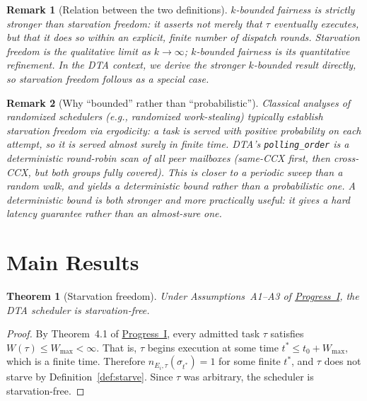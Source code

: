 \documentclass[11pt,a4paper]{article}
\newtheorem{theorem}{Theorem}[section]
\newtheorem{remark}{Remark}[section]
\newcommand{\code}[1]{\texttt{#1}}
\begin{document}
\begin{remark}[Relation between the two definitions]
$k$-bounded fairness is strictly stronger than starvation freedom:
it asserts not merely that $\tau$ \emph{eventually} executes, but
that it does so within an \emph{explicit, finite} number of dispatch
rounds.  Starvation freedom is the qualitative limit as
$k \to \infty$; $k$-bounded fairness is its quantitative
refinement.  In the DTA context, we derive the stronger
$k$-bounded result directly, so starvation freedom follows as a
special case.
\end{remark}

\begin{remark}[Why ``bounded'' rather than ``probabilistic'']
Classical analyses of randomized schedulers (e.g., randomized
work-stealing) typically establish starvation freedom via ergodicity:
a task is served with positive probability on each attempt, so it
is served almost surely in finite time.  DTA's \code{polling\_order}
is a \emph{deterministic} round-robin scan of all peer mailboxes
(same-CCX first, then cross-CCX, but both groups fully covered).
This is closer to a \emph{periodic sweep} than a random walk, and
yields a deterministic bound rather than a probabilistic one.
A deterministic bound is both stronger and more practically useful:
it gives a hard latency guarantee rather than an almost-sure one.
\end{remark}

\section{Main Results}

\begin{theorem}[Starvation freedom]
\label{thm:starve-free}
Under Assumptions~A1--A3 of \hyperref[chap:bounded_wait]{Progress~I}, the
DTA scheduler is starvation-free.
\end{theorem}

\begin{proof}
By Theorem~4.1 of \hyperref[chap:bounded_wait]{Progress~I}, every admitted task
$\tau$ satisfies $W(\tau) \leq W_{\max} < \infty$.  That is,
$\tau$ begins execution at some time $t^* \leq t_0 + W_{\max}$,
which is a finite time.  Therefore $n_{E_i, \tau}(\sigma_{t^*}) = 1$
for some finite $t^*$, and $\tau$ does not starve by
Definition~\ref{def:starve}.  Since $\tau$ was arbitrary, the
scheduler is starvation-free.
\end{proof}
\end{document}
